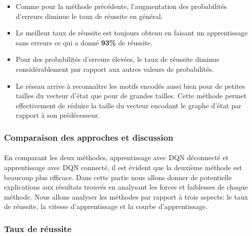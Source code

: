 \begin{itemize}
	\item Comme pour la méthode précédente, l'augmentation des probabilités d'erreurs diminue le taux de réussite en général.
	\item Le meilleur taux de réussite est toujours obtenu en faisant un apprentissage sans erreurs ce qui a donné \textbf{93\%} de réussite.
	\item Pour des probabilités d'erreurs élevées, le taux de réussite diminue considérablement par rapport aux autres valeurs de probabilités.
	\item Le réseau arrive à reconnaître les motifs encodés aussi bien pour de petites tailles du vecteur d'état que pour de grandes tailles. Cette méthode permet effectivement de réduire la taille du vecteur encodant le graphe d'état par rapport à son prédécesseur.	
\end{itemize}

\subsubsection{Comparaison des approches et discussion}
\paragraph{}En comparant les deux méthodes, apprentissage avec DQN déconnecté et apprentissage avec DQN connecté, il est évident que la deuxième méthode est beaucoup plus efficace. Dans cette partie nous allons donner de potentielle explications aux résultats trouvés en analysant les forces et faiblesses de chaque méthode. Nous allons analyser les méthodes par rapport à trois aspects: le taux de réussite, la vitesse d'apprentissage et la courbe d'apprentissage.
\subsubsection{Taux de réussite}\label{success_rate}
